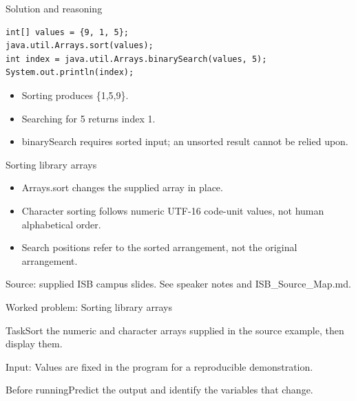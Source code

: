 \documentclass[10pt,aspectratio=169]{beamer}
\begin{document}
\begin{frame}[fragile,t]{Solution and reasoning}
\begin{lstlisting}
int[] values = {9, 1, 5};
java.util.Arrays.sort(values);
int index = java.util.Arrays.binarySearch(values, 5);
System.out.println(index);
\end{lstlisting}\vspace{1mm}\small\begin{itemize}
\item Sorting produces \{1,5,9\}.
\item Searching for 5 returns index 1.
\item binarySearch requires sorted input; an unsorted result cannot be relied upon.
\end{itemize}
\end{frame}

\begin{frame}[fragile,t]{Sorting library arrays}
\begin{itemize}
\item Arrays.sort changes the supplied array in place.
\item Character sorting follows numeric UTF{-}16 code{-}unit values, not human alphabetical order.
\item Search positions refer to the sorted arrangement, not the original arrangement.
\end{itemize}
\vspace{3mm}\footnotesize\textcolor{accent}{Source: supplied ISB campus slides. See speaker notes and ISB\_Source\_Map.md.}
\end{frame}

\begin{frame}[fragile,t]{Worked problem: Sorting library arrays}
\begin{block}{Task}Sort the numeric and character arrays supplied in the source example, then display them.\end{block}
\small Input: Values are fixed in the program for a reproducible demonstration.\par\vspace{3mm}\begin{exampleblock}{Before running}Predict the output and identify the variables that change.\end{exampleblock}
\end{frame}
\end{document}
